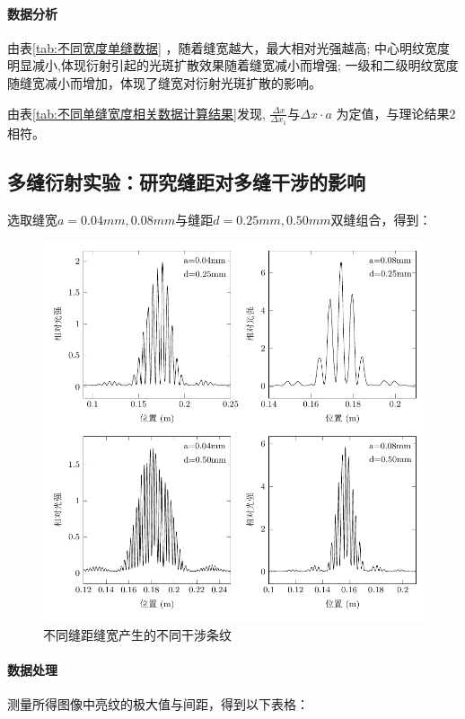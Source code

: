 \documentclass[a4paper]{../phyreport}
\begin{document}
\paragraph{数据分析}
由表\ref{tab:不同宽度单缝数据} ，随着缝宽越大，最大相对光强越高;
中心明纹宽度明显减小,体现衍射引起的光斑扩散效果随着缝宽减小而增强;
一级和二级明纹宽度随缝宽减小而增加，体现了缝宽对衍射光斑扩散的影响。

由表\ref{tab:不同单缝宽度相关数据计算结果}发现,
$\frac{\Delta x}{\Delta x_1}$与$ \Delta x \cdot a$ 为定值，与理论结果2相符。
\subsection{多缝衍射实验：研究缝距对多缝干涉的影响}

选取缝宽$a=0.04mm, 0.08mm$与缝距$d=0.25mm, 0.50mm$双缝组合，得到：

\begin{figure}[H]
  \centering
  \includegraphics[]{fig/多缝/双峰改变ad4图.pdf}
  \caption{不同缝距缝宽产生的不同干涉条纹} \label{缝间距}
\end{figure}

\paragraph{数据处理}
测量所得图像中亮纹的极大值与间距，得到以下表格：
\end{document}
